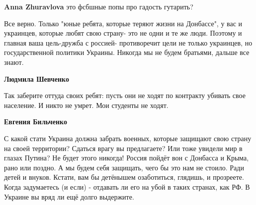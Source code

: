 \begin{itemize}
\begin{itemize}
\textbf{Anna Zhuravlova} это фсбшные попы про гадость гутарить?
\end{itemize}

 

Все верно. Только "юные ребята, которые теряют жизни на Донбассе", у вас и
украинцев, которые любят свою страну- это не одни и те же люди. Поэтому и
главная ваша цель-дружба с россией- противоречит цели не только украинцев, но
государственной политики Украины. Никогда мы не будем братьями, дальше все
знают.

\begin{itemize}
 
\textbf{Людмила Шевченко} 

Так заберите оттуда своих ребят: пусть они не ходят по контракту убивать свое
население. И никто не умрет. Мои студенты не ходят.


 
\textbf{Евгения Бильченко} 

С какой стати Украина должна забрать военных,
которые защищают свою страну на своей территории? Сдаться врагу вы предлагаете?
Или тоже увидели мир в глазах Путина? Не будет этого никогда! Россия пойдёт вон
с Донбасса и Крыма, рано или поздно. А мы будем себя защищать, чего бы это нам
не стоило. Ради детей и внуков. Кстати, вам бы детёнышем озаботиться, глядишь,
и прозреете. Когда задумаетесь (и если) - отдавать ли его на убой в таких
странах, как РФ. В Украине вы вряд ли ещё долго выдержите.

 

\end{itemize}
\end{itemize}
